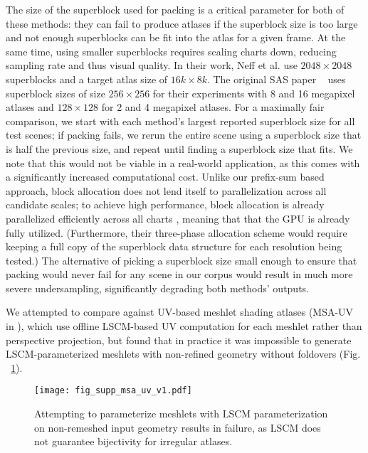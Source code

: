 The size of the superblock used for packing is a critical parameter for both of these methods: they can fail to produce atlases if the superblock size is too large and not enough superblocks can be fit into the atlas for a given frame. At the same time, using smaller superblocks requires scaling charts down, reducing sampling rate and thus visual quality. In their work, Neff et al. use $2048 \times 2048$ superblocks and a target atlas size of $16k \times 8k$. The original SAS paper ~ uses superblock sizes of size $256 \times 256$ for their experiments with 8 and 16 megapixel atlases and $128 \times 128$ for 2 and 4 megapixel atlases. For a maximally fair comparison, we start with each method's largest reported superblock size for all test scenes; if packing fails, we rerun the entire scene using a superblock size that is half the previous size, and repeat until finding a superblock size that fits. We note that this would not be viable in a real-world application, as this comes with a significantly increased computational cost. Unlike our prefix-sum based approach, block allocation does not lend itself to parallelization across all candidate scales; to achieve high performance, block allocation is already parallelized efficiently across all charts \cite{mueller2018shading}, meaning that that the GPU is already fully utilized. (Furthermore, their three-phase allocation scheme would require keeping a full copy of the superblock data structure for each resolution being tested.) The alternative of picking a superblock size small enough to ensure that packing would never fail for any scene in our corpus would result in much more severe undersampling, significantly degrading both methods' outputs. 

We attempted to compare against UV-based meshlet shading atlases (MSA-UV in \cite{Neff2022MSA}), which use offline LSCM-based UV computation for each meshlet rather than perspective projection, but found that in practice it was impossible to generate LSCM-parameterized meshlets with non-refined geometry without foldovers (Fig. ~\ref{fig:msa_uv_foldover_fail}). 

\begin{figure}
\texttt{[image: fig\_supp\_msa\_uv\_v1.pdf]}
\caption{Attempting to parameterize meshlets with LSCM parameterization on non-remeshed input geometry results in failure, as LSCM does not guarantee bijectivity for irregular atlases.}
\label{fig:msa_uv_foldover_fail}
\end{figure}

